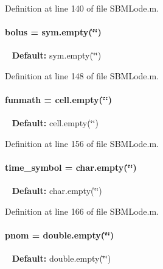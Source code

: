 Definition at line 140 of file S\+B\+M\+Lode.\+m.

\hypertarget{class_s_b_m_lode_ab9227561ac246ee4b70f9e65c25ffda7}{}
\paragraph[{bolus}]{\setlength{\rightskip}{0pt plus 5cm}bolus = sym.\+empty(\char`\"{}\char`\"{})}\label{class_s_b_m_lode_ab9227561ac246ee4b70f9e65c25ffda7}
~\newline
{\bfseries Default\+:} sym.\+empty(\char`\"{}\char`\"{}) 

Definition at line 148 of file S\+B\+M\+Lode.\+m.

\hypertarget{class_s_b_m_lode_a9c1cb6154a226c993c60010300a62e34}{}
\paragraph[{funmath}]{\setlength{\rightskip}{0pt plus 5cm}funmath = cell.\+empty(\char`\"{}\char`\"{})}\label{class_s_b_m_lode_a9c1cb6154a226c993c60010300a62e34}
~\newline
{\bfseries Default\+:} cell.\+empty(\char`\"{}\char`\"{}) 

Definition at line 156 of file S\+B\+M\+Lode.\+m.

\hypertarget{class_s_b_m_lode_ac38903669f208bc49c971c7a69f62225}{}
\paragraph[{time\+\_\+symbol}]{\setlength{\rightskip}{0pt plus 5cm}time\+\_\+symbol = char.\+empty(\char`\"{}\char`\"{})}\label{class_s_b_m_lode_ac38903669f208bc49c971c7a69f62225}
~\newline
{\bfseries Default\+:} char.\+empty(\char`\"{}\char`\"{}) 

Definition at line 166 of file S\+B\+M\+Lode.\+m.

\hypertarget{class_s_b_m_lode_aab64bc684d10326610cc4e866d7ed65c}{}
\paragraph[{pnom}]{\setlength{\rightskip}{0pt plus 5cm}pnom = double.\+empty(\char`\"{}\char`\"{})}\label{class_s_b_m_lode_aab64bc684d10326610cc4e866d7ed65c}
~\newline
{\bfseries Default\+:} double.\+empty(\char`\"{}\char`\"{}) 

